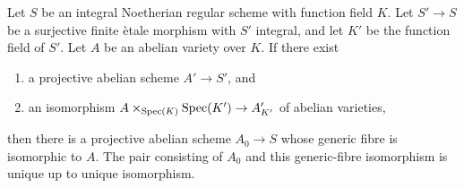 \begin{proposition}
\label{proposition-abelian-model-finite-etale-descent}
\begin{reference}
\cite[Expos\'e 190, Proposition 5.1, p. 324]{FGA}
\end{reference}
Let $S$ be an integral Noetherian regular scheme with function field $K$.
Let $S' \to S$ be a surjective finite \`etale morphism with $S'$ integral,
and let $K'$ be the function field of $S'$. Let $A$ be an abelian variety
over $K$. If there exist
\begin{enumerate}
\item a projective abelian scheme $A' \to S'$, and
\item an isomorphism $A \times_{\mathop{\mathrm{Spec}}(K)} \mathop{\mathrm{Spec}}(K') \to A'_{K'}$
of abelian varieties,
\end{enumerate}
then there is a projective abelian scheme $A_0 \to S$ whose generic fibre
is isomorphic to $A$. The pair consisting of $A_0$ and this generic-fibre
isomorphism is unique up to unique isomorphism.
\end{proposition}

